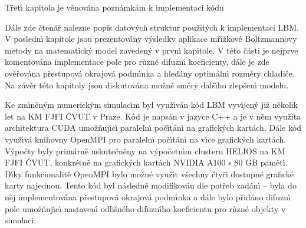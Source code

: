     T\v{r}et\'{\i} kapitola je v\v{e}nov\'{a}na pozn\'{a}mk\'{a}m k implementaci k\'{o}du

    D\'{a}le zde \v{c}ten\'{a}\v{r} nalezne popis datov\'{y}ch struktur pou\v{z}it\'{y}ch k implementaci LBM. V posledn\'{\i} kapitole jsou prezentov\'{a}ny v\'{y}sledky aplikace m\v{r}\'{\i}\v{z}kov\'{e} Boltzmannovy metody na matematick\'{y} model zaveden\'{y} v prvn\'{\i} kapitole. V t\'{e}to \v{c}\'{a}sti je nejprve komentov\'{a}na implementace pole pro r\r{u}zn\'{e} difuzn\'{\i} koeficienty, d\'{a}le je zde ov\v{e}\v{r}ov\'{a}na p\v{r}estupov\'{a} okrajov\'{a} podm\'{\i}nka a hled\'{a}ny optim\'{a}ln\'{\i} rozm\v{e}ry chladi\v{c}e. Na z\'{a}v\v{e}r t\'{e}to kapitoly jsou diskutov\'{a}na mo\v{z}n\'{e} sm\v{e}ry dal\v{s}\'{\i}ho zlep\v{s}en\'{\i} modelu.

    Ke zm\'{\i}n\v{e}n\'{y}m numerick\'{y}m simulac\'{\i}m byl vyu\v{z}\'{\i}v\'{a}n k\'{o}d LBM vyv\'{\i}jen\'{y} ji\v{z} n\v{e}kolik let na KM FJFI \v{C}VUT v Praze. K\'{o}d je naps\'{a}n v jazyce C++ a je v n\v{e}m vyu\v{z}ita architektura CUDA umo\v{z}\v{n}uj\'{\i}c\'{\i} paraleln\'{\i} po\v{c}\'{\i}t\'{a}n\'{\i} na grafick\'{y}ch kart\'{a}ch. D\'{a}le k\'{o}d vyu\v{z}\'{\i}v\'{a} knihovny OpenMPI pro paraleln\'{\i} po\v{c}\'{\i}t\'{a}n\'{\i} na v\'{\i}ce grafick\'{y}ch kart\'{a}ch. V\'{y}po\v{c}ty byly prim\'{a}rn\v{e} uskute\v{c}n\v{e}ny na v\'{y}po\v{c}etn\'{\i}m clusteru HELIOS na KM FJFI \v{C}VUT, konkr\'{e}tn\v{e} na grafick\'{y}ch kart\'{a}ch NVIDIA A100 s 80 GB pam\v{e}t\'{\i}. D\'{\i}ky funkcionalit\v{e} OpenMPI bylo mo\v{z}n\'{e} vyu\v{z}\'{\i}t v\v{s}echny \v{c}ty\v{r}i dostupn\'{e} grafick\'{e} karty najednou. Tento k\'{o}d byl n\'{a}sledn\v{e} modifikov\'{a}n dle pot\v{r}eb zad\'{a}n\'{\i} -- byla do n\v{e}j implementov\'{a}na p\v{r}estupov\'{a} okrajov\'{a} podm\'{\i}nka a d\'{a}le bylo p\v{r}id\'{a}no difuzn\'{\i} pole umo\v{z}\v{n}uj\'{\i}c\'{\i} nastaven\'{\i} odli\v{s}n\'{e}ho difuzn\'{\i}ho koeficientu pro r\r{u}zn\'{e} objekty v simulaci. 


